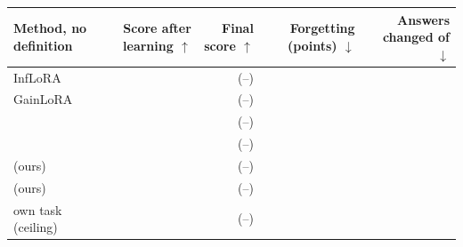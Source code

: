 {\footnotesize\setlength{\tabcolsep}{2.5pt}\begin{tabular}{lrrrr}
    \toprule
    Method, no definition & \shortstack[r]{Score after\\learning $\uparrow$} & \shortstack[r]{Final\\score $\uparrow$} & \shortstack[r]{Forgetting\\(points) $\downarrow$} & \shortstack[r]{Answers changed\\of \AudSeedsCompared{} $\downarrow$} \\
    \midrule
    InfLoRA & \AudSeedsInfloraLearned{} & \AudSeedsInfloraAP{} {\scriptsize (\AudSeedsInfloraAPLow{}--\AudSeedsInfloraAPHigh{})} & \AudSeedsInfloraFT{} & \AudSeedsInfloraChanged{} \\
    GainLoRA & \AudSeedsGainloraLearned{} & \AudSeedsGainloraAP{} {\scriptsize (\AudSeedsGainloraAPLow{}--\AudSeedsGainloraAPHigh{})} & \AudSeedsGainloraFT{} & \AudSeedsGainloraChanged{} \\
    \midrule
    \plain{} & \AudSeedsPlainLearned{} & \AudSeedsPlainAP{} {\scriptsize (\AudSeedsPlainAPLow{}--\AudSeedsPlainAPHigh{})} & \AudSeedsPlainFT{} & \AudSeedsPlainChanged{} \\
    \centre{} & \AudSeedsCentreLearned{} & \AudSeedsCentreAP{} {\scriptsize (\AudSeedsCentreAPLow{}--\AudSeedsCentreAPHigh{})} & \AudSeedsCentreFT{} & \AudSeedsCentreChanged{} \\
    \recog{} (ours) & \AudSeedsRidgeLearned{} & \AudSeedsRidgeAP{} {\scriptsize (\AudSeedsRidgeAPLow{}--\AudSeedsRidgeAPHigh{})} & \AudSeedsRidgeFT{} & \AudSeedsRidgeChanged{} \\
    \handicap{} (ours) & \AudSeedsHandicapLearned{} & \AudSeedsHandicapAP{} {\scriptsize (\AudSeedsHandicapAPLow{}--\AudSeedsHandicapAPHigh{})} & \AudSeedsHandicapFT{} & \AudSeedsHandicapChanged{} \\
    own task (ceiling) & \AudSeedsOwnLearned{} & \AudSeedsOwnAP{} {\scriptsize (\AudSeedsOwnAPLow{}--\AudSeedsOwnAPHigh{})} & \AudSeedsOwnFT{} & \AudSeedsOwnChanged{} \\
    \bottomrule
\end{tabular}}
